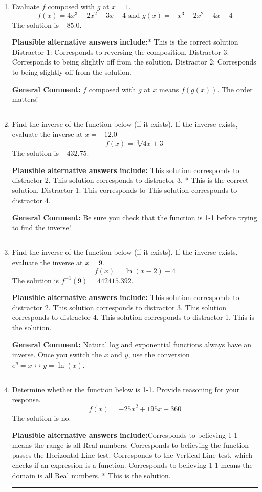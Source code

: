 \documentclass{extbook}[14pt]
\newcommand{\litem}[1]{\item #1

\rule{\textwidth}{0.4pt}}
\begin{document}
\begin{enumerate}\litem{
Evaluate $f$ composed with $g$ at $x=1$.
\[ f(x) = 4x^{3} +2 x^{2} -3 x -4 \text{ and } g(x) = -x^{3} -2 x^{2} +4 x -4 \]The solution is \( -85.0 \).\begin{enumerate}[label=\Alph*.]
\textbf{Plausible alternative answers include:}* This is the correct solution
 Distractor 1: Corresponds to reversing the composition.
 Distractor 3: Corresponds to being slightly off from the solution.
 Distractor 2: Corresponds to being slightly off from the solution.

\end{enumerate}

\textbf{General Comment:} $f$ composed with $g$ at $x$ means $f(g(x))$. The order matters!
}
\litem{
Find the inverse of the function below (if it exists). If the inverse exists, evaluate the inverse at $x = -12.0$
\[ f(x) = \sqrt[3]{4 x + 3} \]The solution is \( -432.75 \).\begin{enumerate}[label=\Alph*.]
\textbf{Plausible alternative answers include:} This solution corresponds to distractor 2.
 This solution corresponds to distractor 3.
* This is the correct solution.
 Distractor 1: This corresponds to 
 This solution corresponds to distractor 4.
\end{enumerate}

\textbf{General Comment:} Be sure you check that the function is 1-1 before trying to find the inverse!
}
\litem{
Find the inverse of the function below (if it exists). If the inverse exists, evaluate the inverse at $x = 9$.
\[ f(x) = \ln{(x-2)}-4 \]The solution is \( f^{-1}(9) = 442415.392 \).\begin{enumerate}[label=\Alph*.]
\textbf{Plausible alternative answers include:} This solution corresponds to distractor 2.
 This solution corresponds to distractor 3.
 This solution corresponds to distractor 4.
 This solution corresponds to distractor 1.
 This is the solution.
\end{enumerate}

\textbf{General Comment:} Natural log and exponential functions always have an inverse. Once you switch the $x$ and $y$, use the conversion $ e^y = x \leftrightarrow y=\ln(x)$.
}
\litem{
Determine whether the function below is 1-1. Provide reasoning for your response.
\[ f(x) = -25 x^2 + 195 x - 360 \]The solution is \( \text{no} \).\begin{enumerate}[label=\Alph*.]
\textbf{Plausible alternative answers include:}Corresponds to believing 1-1 means the range is all Real numbers.
Corresponds to believing the function passes the Horizontal Line test.
Corresponds to the Vertical Line test, which checks if an expression is a function.
Corresponds to believing 1-1 means the domain is all Real numbers.
* This is the solution.
\end{enumerate}

}
\end{enumerate}
\end{document}
